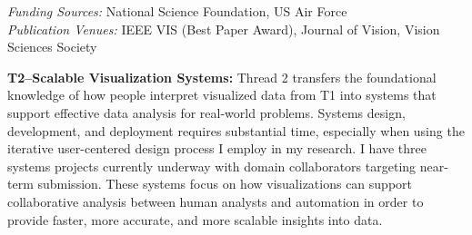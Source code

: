 \documentclass[11pt]{article}
\begin{document}

\emph{Funding Sources:} National Science Foundation, US Air Force\\
\emph{Publication Venues:} IEEE VIS (Best Paper Award), Journal of Vision, Vision Sciences Society

\textbf{T2--Scalable Visualization Systems: }
Thread 2 transfers the foundational knowledge of how people interpret visualized data from T1 into systems that support effective data analysis for real-world problems. 
Systems design, development, and deployment requires substantial time, especially when using the iterative user-centered design process I employ in my research. I have three systems projects currently underway with domain collaborators targeting near-term submission. These systems focus on how visualizations can support collaborative analysis between human analysts and automation in order to provide faster, more accurate, and more scalable insights into data.
\end{document}

